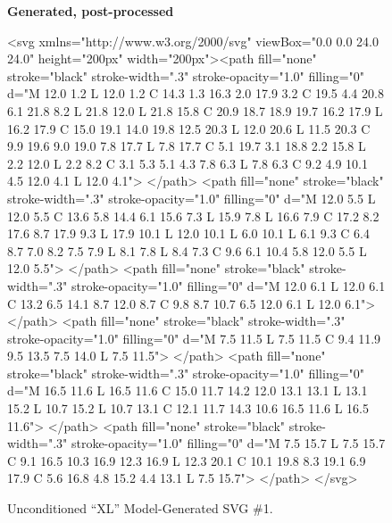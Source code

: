 \documentclass[11pt]{article}
\begin{document}
\begin{figure}[htbp]
	\centering

	\begin{center}
		\textbf{Generated, post-processed}
	\end{center}

	<svg xmlns="http://www.w3.org/2000/svg" viewBox="0.0 0.0 24.0 24.0" height="200px" width="200px"><path fill="none" stroke="black" stroke-width=".3" stroke-opacity="1.0" filling="0" d="M 12.0 1.2 L 12.0 1.2 C 14.3 1.3 16.3 2.0 17.9 3.2 C 19.5 4.4 20.8 6.1 21.8 8.2 L 21.8 12.0 L 21.8 15.8 C 20.9 18.7 18.9 19.7 16.2 17.9 L 16.2 17.9 C 15.0 19.1 14.0 19.8 12.5 20.3 L 12.0 20.6 L 11.5 20.3 C 9.9 19.6 9.0 19.0 7.8 17.7 L 7.8 17.7 C 5.1 19.7 3.1 18.8 2.2 15.8 L 2.2 12.0 L 2.2 8.2 C 3.1 5.3 5.1 4.3 7.8 6.3 L 7.8 6.3 C 9.2 4.9 10.1 4.5 12.0 4.1 L 12.0 4.1"> </path> <path fill="none" stroke="black" stroke-width=".3" stroke-opacity="1.0" filling="0" d="M 12.0 5.5 L 12.0 5.5 C 13.6 5.8 14.4 6.1 15.6 7.3 L 15.9 7.8 L 16.6 7.9 C 17.2 8.2 17.6 8.7 17.9 9.3 L 17.9 10.1 L 12.0 10.1 L 6.0 10.1 L 6.1 9.3 C 6.4 8.7 7.0 8.2 7.5 7.9 L 8.1 7.8 L 8.4 7.3 C 9.6 6.1 10.4 5.8 12.0 5.5 L 12.0 5.5"> </path> <path fill="none" stroke="black" stroke-width=".3" stroke-opacity="1.0" filling="0" d="M 12.0 6.1 L 12.0 6.1 C 13.2 6.5 14.1 8.7 12.0 8.7 C 9.8 8.7 10.7 6.5 12.0 6.1 L 12.0 6.1"> </path> <path fill="none" stroke="black" stroke-width=".3" stroke-opacity="1.0" filling="0" d="M 7.5 11.5 L 7.5 11.5 C 9.4 11.9 9.5 13.5 7.5 14.0 L 7.5 11.5"> </path> <path fill="none" stroke="black" stroke-width=".3" stroke-opacity="1.0" filling="0" d="M 16.5 11.6 L 16.5 11.6 C 15.0 11.7 14.2 12.0 13.1 13.1 L 13.1 15.2 L 10.7 15.2 L 10.7 13.1 C 12.1 11.7 14.3 10.6 16.5 11.6 L 16.5 11.6"> </path> <path fill="none" stroke="black" stroke-width=".3" stroke-opacity="1.0" filling="0" d="M 7.5 15.7 L 7.5 15.7 C 9.1 16.5 10.3 16.9 12.3 16.9 L 12.3 20.1 C 10.1 19.8 8.3 19.1 6.9 17.9 C 5.6 16.8 4.8 15.2 4.4 13.1 L 7.5 15.7"> </path> </svg>


	\hfill
	\begin{subfigure}[b]{\linewidth}
		\centering
		\begin{subfigure}[b]{.4\textwidth}
			\centering
			
		\end{subfigure}
	\end{subfigure}

	\caption{Unconditioned ``XL'' Model-Generated SVG \#1.}
	\label{Unconditioned_0}
\end{figure}
\end{document}
